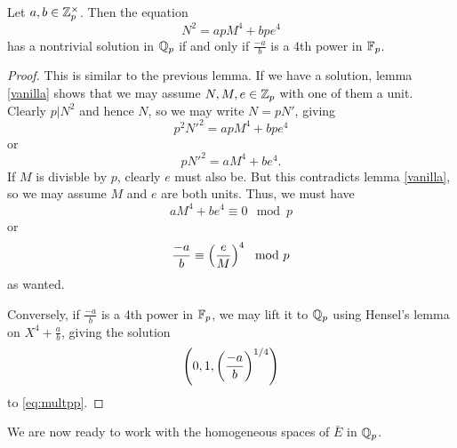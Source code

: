 \documentclass[12pt, a4paper]{report}
\begin{document}
\begin{lemma} \label{multpp}
  Let $a, b \in {\mathbb Z}_p^\times$. Then the equation
  \begin{equation}
    \label{eq:multpp}
    N^2 = apM^4 + bpe^4
  \end{equation}
  has a nontrivial solution in ${\mathbb Q}_p$ if and only if
  $\frac{-a}{b}$ is a 4th power in $\mathbb{F}_p$.
\end{lemma}

\begin{proof}
  This is similar to the previous lemma. If we have a solution,
  lemma \autoref{vanilla} shows that we may assume $N, M, e \in {\mathbb Z}_p$ with one
  of them a unit. Clearly $p | N^2$ and hence $N$, so we may write $N = pN'$,
  giving
  \[p^2N'^2 = apM^4 + bpe^4\]
  or
  \[pN'^2 = aM^4 + be^4.\]
  If $M$ is divisble by $p$, clearly $e$ must also be. But this contradicts lemma
  \autoref{vanilla}, so we may assume $M$ and $e$ are both units.
  Thus, we must have
  \[aM^4 + be^4 \equiv 0 \mod{p}\]
  or
  \[\frac{-a}{b} \equiv \left(\frac{e}{M}\right)^4 \mod{p}\]
  as wanted.

  Conversely, if $\frac{-a}{b}$ is a 4th power in $\mathbb{F}_p$, we may lift it to
  ${\mathbb Q}_p$ using
  Hensel's lemma on $X^4 + \frac{a}{b}$, giving the solution
  \[\left(0, 1, \left(\frac{-a}{b}\right)^{1/4}\right)\]
  to \autoref{eq:multpp}.
\end{proof}

We are now ready to work with the homogeneous spaces of $\bar{E}$ in ${\mathbb Q}_p$.
\end{document}
